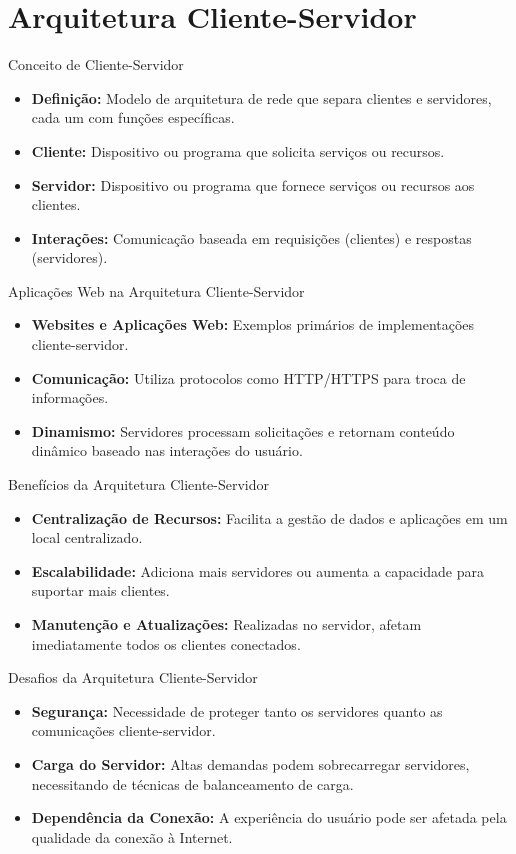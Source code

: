 \section{Arquitetura Cliente-Servidor}
\begin{frame}{Conceito de Cliente-Servidor}
  \begin{itemize}
    \item \textbf{Definição:} Modelo de arquitetura de rede que separa clientes e servidores, cada um com funções específicas.
    \item \textbf{Cliente:} Dispositivo ou programa que solicita serviços ou recursos.
    \item \textbf{Servidor:} Dispositivo ou programa que fornece serviços ou recursos aos clientes.
    \item \textbf{Interações:} Comunicação baseada em requisições (clientes) e respostas (servidores).
  \end{itemize}
\end{frame}

\begin{frame}{Aplicações Web na Arquitetura Cliente-Servidor}
  \begin{itemize}
    \item \textbf{Websites e Aplicações Web:} Exemplos primários de implementações cliente-servidor.
    \item \textbf{Comunicação:} Utiliza protocolos como HTTP/HTTPS para troca de informações.
    \item \textbf{Dinamismo:} Servidores processam solicitações e retornam conteúdo dinâmico baseado nas interações do usuário.
  \end{itemize}
\end{frame}

\begin{frame}{Benefícios da Arquitetura Cliente-Servidor}
  \begin{itemize}
    \item \textbf{Centralização de Recursos:} Facilita a gestão de dados e aplicações em um local centralizado.
    \item \textbf{Escalabilidade:} Adiciona mais servidores ou aumenta a capacidade para suportar mais clientes.
    \item \textbf{Manutenção e Atualizações:} Realizadas no servidor, afetam imediatamente todos os clientes conectados.
  \end{itemize}
\end{frame}

\begin{frame}{Desafios da Arquitetura Cliente-Servidor}
  \begin{itemize}
    \item \textbf{Segurança:} Necessidade de proteger tanto os servidores quanto as comunicações cliente-servidor.
    \item \textbf{Carga do Servidor:} Altas demandas podem sobrecarregar servidores, necessitando de técnicas de balanceamento de carga.
    \item \textbf{Dependência da Conexão:} A experiência do usuário pode ser afetada pela qualidade da conexão à Internet.
  \end{itemize}
\end{frame}

